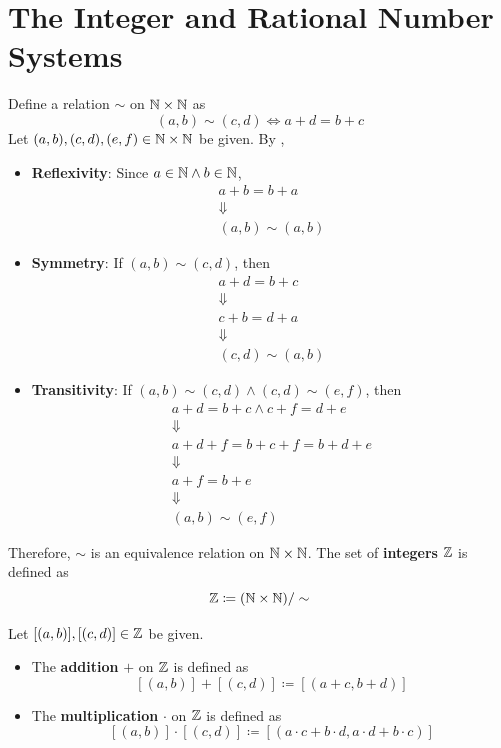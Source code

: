 \section{The Integer and Rational Number Systems}

Define a relation $\sim$ on $\mathbb{N} \times \mathbb{N}$ as
\[
(a, b) \sim (c, d) \iff a + d = b + c
\]
Let $(a, b), (c, d), (e, f) \in \mathbb{N} \times \mathbb{N}$ be given. By ,
\begin{itemize}
    \item \textbf{Reflexivity}: Since $a \in \mathbb{N} \land b \in \mathbb{N}$,
    \[
    \begin{array}{c}
        a + b = b + a \\
        \Downarrow \\
        (a, b) \sim (a, b)
    \end{array}
    \]
    \item \textbf{Symmetry}: If $(a, b) \sim (c, d)$, then
    \[
    \begin{array}{c}
        a + d = b + c \\
        \Downarrow \\
        c + b = d + a \\
        \Downarrow \\
        (c, d) \sim (a, b)
    \end{array}
    \]
    \item \textbf{Transitivity}: If $(a, b) \sim (c, d) \land (c, d) \sim (e, f)$, then
    \[
    \begin{array}{c}
        a + d = b + c \land c + f = d + e \\
        \Downarrow \\
        a + d + f = b + c + f = b + d + e \\
        \Downarrow \\
        a + f = b + e \\
        \Downarrow \\
        (a, b) \sim (e, f)
    \end{array}
    \]
\end{itemize}
Therefore, $\sim$ is an equivalence relation on $\mathbb{N} \times \mathbb{N}$. The set of \textbf{integers} $\mathbb{Z}$ is defined as
\[
\mathbb{Z} \coloneqq (\mathbb{N} \times \mathbb{N}) / \sim
\]

\bigskip

\begin{definition} \label{an:def:operations-on-Z}
    Let $[(a, b)], [(c, d)] \in \mathbb{Z}$ be given.
    \begin{itemize}
        \item The \textbf{addition} $+$ on $\mathbb{Z}$ is defined as
        \[
        [(a, b)] + [(c, d)] \coloneqq [(a + c, b + d)]
        \]
        \item The \textbf{multiplication} $\cdot$ on $\mathbb{Z}$ is defined as
        \[
        [(a, b)] \cdot [(c, d)] \coloneqq [(a \cdot c + b \cdot d, a \cdot d + b \cdot c)]
        \]
    \end{itemize}
\end{definition}

